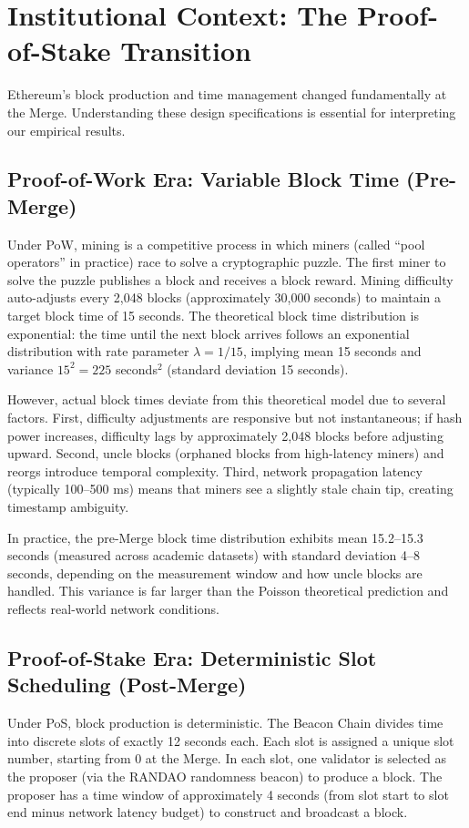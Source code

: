 \documentclass[12pt]{article}
\begin{document}
\section{Institutional Context: The Proof-of-Stake Transition}

Ethereum's block production and time management changed fundamentally at the Merge. Understanding these design specifications is essential for interpreting our empirical results.

\subsection{Proof-of-Work Era: Variable Block Time (Pre-Merge)}

Under PoW, mining is a competitive process in which miners (called ``pool operators'' in practice) race to solve a cryptographic puzzle. The first miner to solve the puzzle publishes a block and receives a block reward. Mining difficulty auto-adjusts every 2,048 blocks (approximately 30,000 seconds) to maintain a target block time of 15 seconds. The theoretical block time distribution is exponential: the time until the next block arrives follows an exponential distribution with rate parameter $\lambda = 1/15$, implying mean 15 seconds and variance $15^2 = 225$ seconds$^2$ (standard deviation 15 seconds).

However, actual block times deviate from this theoretical model due to several factors. First, difficulty adjustments are responsive but not instantaneous; if hash power increases, difficulty lags by approximately 2,048 blocks before adjusting upward. Second, uncle blocks (orphaned blocks from high-latency miners) and reorgs introduce temporal complexity. Third, network propagation latency (typically 100–500 ms) means that miners see a slightly stale chain tip, creating timestamp ambiguity.

In practice, the pre-Merge block time distribution exhibits mean 15.2–15.3 seconds (measured across academic datasets) with standard deviation 4–8 seconds, depending on the measurement window and how uncle blocks are handled. This variance is far larger than the Poisson theoretical prediction and reflects real-world network conditions.

\subsection{Proof-of-Stake Era: Deterministic Slot Scheduling (Post-Merge)}

Under PoS, block production is deterministic. The Beacon Chain divides time into discrete slots of exactly 12 seconds each. Each slot is assigned a unique slot number, starting from 0 at the Merge. In each slot, one validator is selected as the proposer (via the RANDAO randomness beacon) to produce a block. The proposer has a time window of approximately 4 seconds (from slot start to slot end minus network latency budget) to construct and broadcast a block.
\end{document}
